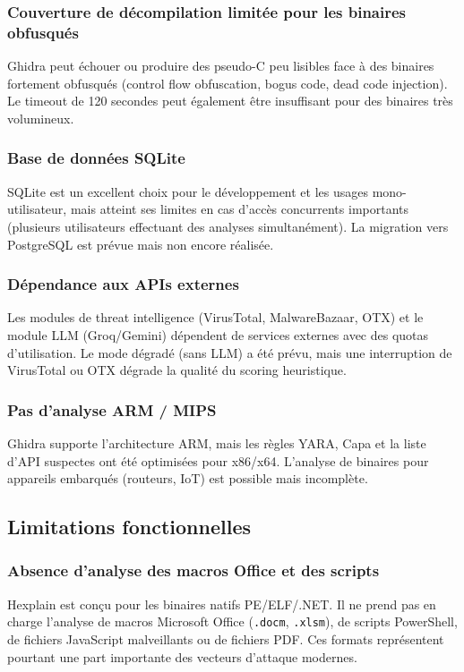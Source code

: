 \subsubsection{Couverture de décompilation limitée pour les binaires obfusqués}
Ghidra peut échouer ou produire des pseudo-C peu lisibles face à des binaires fortement obfusqués (control flow obfuscation, bogus code, dead code injection). Le timeout de 120 secondes peut également être insuffisant pour des binaires très volumineux.

\subsubsection{Base de données SQLite}
SQLite est un excellent choix pour le développement et les usages mono-utilisateur, mais atteint ses limites en cas d'accès concurrents importants (plusieurs utilisateurs effectuant des analyses simultanément). La migration vers PostgreSQL est prévue mais non encore réalisée.

\subsubsection{Dépendance aux APIs externes}
Les modules de threat intelligence (VirusTotal, MalwareBazaar, OTX) et le module LLM (Groq/Gemini) dépendent de services externes avec des quotas d'utilisation. Le mode dégradé (sans LLM) a été prévu, mais une interruption de VirusTotal ou OTX dégrade la qualité du scoring heuristique.

\subsubsection{Pas d'analyse ARM / MIPS}
Ghidra supporte l'architecture ARM, mais les règles YARA, Capa et la liste d'API suspectes ont été optimisées pour x86/x64. L'analyse de binaires pour appareils embarqués (routeurs, IoT) est possible mais incomplète.

\subsection{Limitations fonctionnelles}

\subsubsection{Absence d'analyse des macros Office et des scripts}
Hexplain est conçu pour les binaires natifs PE/ELF/.NET. Il ne prend pas en charge l'analyse de macros Microsoft Office (\texttt{.docm}, \texttt{.xlsm}), de scripts PowerShell, de fichiers JavaScript malveillants ou de fichiers PDF. Ces formats représentent pourtant une part importante des vecteurs d'attaque modernes.

